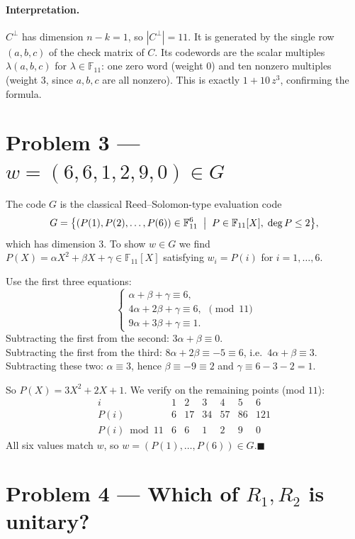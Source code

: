 \documentclass[11pt,a4paper]{article}
\newcommand{\F}{\mathbb{F}}
\begin{document}
\paragraph{Interpretation.}
$C^{\perp}$ has dimension $n-k=1$, so $|C^{\perp}|=11$. It is generated by the single row $(a,b,c)$ of the check matrix of $C$. Its codewords are the scalar multiples $\lambda(a,b,c)$ for $\lambda\in\F_{11}$: one zero word (weight $0$) and ten nonzero multiples (weight $3$, since $a,b,c$ are all nonzero). This is exactly $1+10\,z^{3}$, confirming the formula.

\section*{Problem 3 --- $w=(6,6,1,2,9,0)\in G$}

The code $G$ is the classical Reed--Solomon-type evaluation code
\[
G=\bigl\{(P(1),P(2),\dots,P(6))\in\F_{11}^{6}\;\bigm|\;P\in\F_{11}[X],\;\deg P\le 2\bigr\},
\]
which has dimension $3$. To show $w\in G$ we find $P(X)=\alpha X^2+\beta X+\gamma\in\F_{11}[X]$ satisfying $w_i=P(i)$ for $i=1,\dots,6$.

Use the first three equations:
\[
\begin{cases}
\alpha+\beta+\gamma\equiv 6,\\
4\alpha+2\beta+\gamma\equiv 6,\\
9\alpha+3\beta+\gamma\equiv 1.
\end{cases}\pmod{11}
\]
Subtracting the first from the second: $3\alpha+\beta\equiv 0$.\\
Subtracting the first from the third: $8\alpha+2\beta\equiv -5\equiv 6$, i.e.\ $4\alpha+\beta\equiv 3$.\\
Subtracting these two: $\alpha\equiv 3$, hence $\beta\equiv -9\equiv 2$ and $\gamma\equiv 6-3-2=1$.

So $P(X)=3X^{2}+2X+1$. We verify on the remaining points (mod $11$):
\[
\begin{array}{c|cccccc}
i & 1 & 2 & 3 & 4 & 5 & 6\\\hline
P(i) & 6 & 17 & 34 & 57 & 86 & 121\\
P(i)\bmod 11 & 6 & 6 & 1 & 2 & 9 & 0
\end{array}
\]
All six values match $w$, so $w=(P(1),\dots,P(6))\in G$.\hfill$\blacksquare$

\section*{Problem 4 --- Which of $R_1,R_2$ is unitary?}
\end{document}
